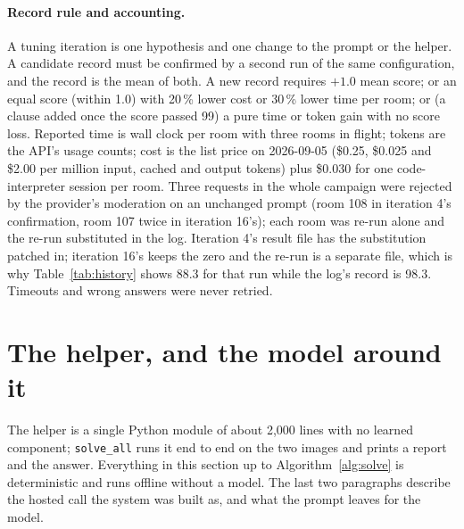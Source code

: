 \documentclass[10pt,a4paper]{article}
\begin{document}
\paragraph{Record rule and accounting.}
A tuning iteration is one hypothesis and one change to the prompt or the helper. A candidate record must be confirmed by a second run of the same configuration, and the record is the mean of both. A new record requires $+1.0$ mean score; or an equal score (within 1.0) with 20\,\% lower cost or 30\,\% lower time per room; or (a clause added once the score passed 99) a pure time or token gain with no score loss. Reported time is wall clock per room with three rooms in flight; tokens are the API's usage counts; cost is the list price on 2026-09-05 (\$0.25, \$0.025 and \$2.00 per million input, cached and output tokens) plus \$0.030 for one code-interpreter session per room. Three requests in the whole campaign were rejected by the provider's moderation on an unchanged prompt (room 108 in iteration 4's confirmation, room 107 twice in iteration 16's); each room was re-run alone and the re-run substituted in the log. Iteration 4's result file has the substitution patched in; iteration 16's keeps the zero and the re-run is a separate file, which is why Table~\ref{tab:history} shows 88.3 for that run while the log's record is 98.3. Timeouts and wrong answers were never retried.

\section{The helper, and the model around it}
\label{sec:system}

The helper is a single Python module of about 2,000 lines with no learned component; \texttt{solve\_all} runs it end to end on the two images and prints a report and the answer. Everything in this section up to Algorithm~\ref{alg:solve} is deterministic and runs offline without a model. The last two paragraphs describe the hosted call the system was built as, and what the prompt leaves for the model.
\end{document}
